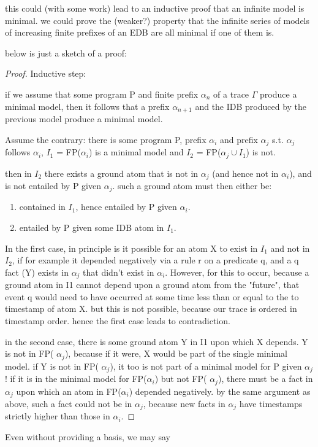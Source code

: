this could (with some work) lead to an inductive proof
that an infinite model is minimal.  we could prove the (weaker?) property that
the infinite series of models of increasing finite prefixes of an EDB are all 
minimal if one of them is.

below is just a sketch of a proof:

\begin{proof}

Inductive step:

if we assume that some program P and finite prefix $\alpha_n$ of a trace $\Gamma$ produce a minimal model, 
then it follows that a prefix $\alpha_{n+1}$ and the IDB produced by the previous model produce a minimal model.

Assume the contrary: there is some program P, prefix $\alpha_i$ and prefix $\alpha_j$  s.t. $\alpha_j$ follows $\alpha_i$, $I_1$ = FP($\alpha_i$) is a minimal model 
and $I_2$ = FP($\alpha_j \cup I_1$) is not.  

then in $I_2$ there exists a ground atom that is not in $\alpha_j$ (and hence not in $\alpha_i$), and is not entailed by P given $\alpha_j$.  
such a ground atom must then either be:

\begin{enumerate}
\item contained in $I_1$, hence entailed by P given $\alpha_i$.
\item entailed by P given some IDB atom in $I_1$.
\end{enumerate}

In the first case, in principle is it possible for an atom X to exist in $I_1$ and not in $I_2$, if for example it depended negatively via a 
rule r on a predicate q, and a q fact (Y) exists in  $\alpha_j$ that didn't exist in  $\alpha_i$.  However, for this to occur, because a ground atom 
in I1 cannot depend upon a ground atom from the "future", that event q would need to have occurred at some time less than 
or equal to the to timestamp of atom X.  but this is not possible, because our trace is ordered in timestamp order.  hence the 
first case leads to contradiction.

in the second case, there is some ground atom Y in I1 upon which X depends.  Y is not in FP( $\alpha_j$), because if it were, X would 
be part of the single minimal model.  if Y is not in FP( $\alpha_j$), it too is not part of a minimal model for P given  $\alpha_j$!  if it is in the minimal 
model for FP($\alpha_i$) but not FP( $\alpha_j$), there must be a fact in  $\alpha_j$ upon which an atom in FP($\alpha_i$) depended negatively.  by the same 
argument as above, such a fact could not be in  $\alpha_j$, because new facts in  $\alpha_j$ have timestamps strictly higher than those in  $\alpha_i$.
\end{proof}

Even without providing a basis, we may say